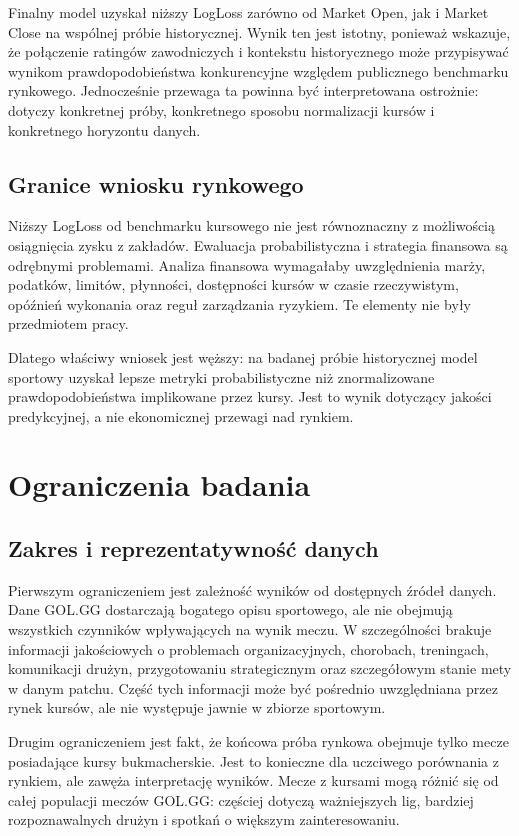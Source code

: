 Finalny model uzyskał niższy LogLoss zarówno od Market Open, jak i Market Close na wspólnej próbie historycznej. Wynik ten jest istotny, ponieważ wskazuje, że połączenie ratingów zawodniczych i kontekstu historycznego może przypisywać wynikom prawdopodobieństwa konkurencyjne względem publicznego benchmarku rynkowego. Jednocześnie przewaga ta powinna być interpretowana ostrożnie: dotyczy konkretnej próby, konkretnego sposobu normalizacji kursów i konkretnego horyzontu danych.

\subsection{Granice wniosku rynkowego}

Niższy LogLoss od benchmarku kursowego nie jest równoznaczny z możliwością osiągnięcia zysku z zakładów. Ewaluacja probabilistyczna i strategia finansowa są odrębnymi problemami. Analiza finansowa wymagałaby uwzględnienia marży, podatków, limitów, płynności, dostępności kursów w czasie rzeczywistym, opóźnień wykonania oraz reguł zarządzania ryzykiem. Te elementy nie były przedmiotem pracy.

Dlatego właściwy wniosek jest węższy: na badanej próbie historycznej model sportowy uzyskał lepsze metryki probabilistyczne niż znormalizowane prawdopodobieństwa implikowane przez kursy. Jest to wynik dotyczący jakości predykcyjnej, a nie ekonomicznej przewagi nad rynkiem.

\section{Ograniczenia badania}

\subsection{Zakres i reprezentatywność danych}

Pierwszym ograniczeniem jest zależność wyników od dostępnych źródeł danych. Dane GOL.GG dostarczają bogatego opisu sportowego, ale nie obejmują wszystkich czynników wpływających na wynik meczu. W szczególności brakuje informacji jakościowych o problemach organizacyjnych, chorobach, treningach, komunikacji drużyn, przygotowaniu strategicznym oraz szczegółowym stanie mety w danym patchu. Część tych informacji może być pośrednio uwzględniana przez rynek kursów, ale nie występuje jawnie w zbiorze sportowym.

Drugim ograniczeniem jest fakt, że końcowa próba rynkowa obejmuje tylko mecze posiadające kursy bukmacherskie. Jest to konieczne dla uczciwego porównania z rynkiem, ale zawęża interpretację wyników. Mecze z kursami mogą różnić się od całej populacji meczów GOL.GG: częściej dotyczą ważniejszych lig, bardziej rozpoznawalnych drużyn i spotkań o większym zainteresowaniu.

